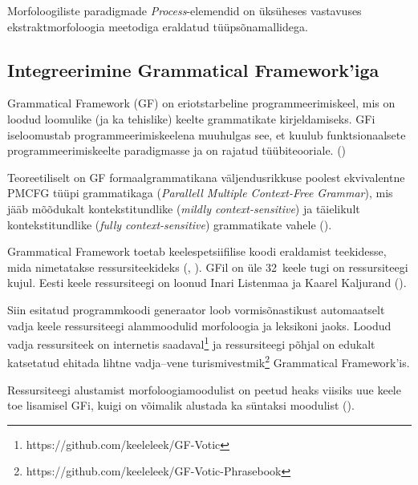 \documentclass[12pt,a4paper]{article}
\begin{document}
Morfoloogiliste paradigmade \textit{Process}-elemendid on üks\-üheses vastavuses ekstrakt\-morfoloogia meetodiga eraldatud tüüpsõna\-mallidega.




\FloatBarrier
\subsection{Integreerimine Grammatical Framework'iga}
\label{sec:gf}

Grammatical Framework (GF) on eriotstarbeline programmeerimis\-keel, mis on loodud loomulike (ja ka tehislike) keelte grammatikate kirjeldamiseks. GFi iseloomustab programmeerimis\-keelena muuhulgas see, et kuulub funktsionaalsete programmeerimis\-keelte paradigmasse ja on rajatud tüübiteooriale. (\cite[\RN{7}]{ranta_grammatical_2011}) %

Teoreetiliselt on GF formaal\-grammatikana väljendus\-rikkuse poolest ekvivalentne PMCFG tüüpi grammatikaga (\textit{Parallell Multiple Context-Free Grammar}), mis jääb mõõdukalt konteksti\-tundlike (\textit{mildly context-sensitive}) ja täielikult konteksti\-tundlike (\textit{fully context-sensitive}) grammatikate vahele (\cite[10]{ranta_grammatical_2011}).

Grammatical Framework toetab keele\-spetsiifilise koodi eraldamist teekidesse, mida nimetatakse ressursi\-teekideks (\cite{ranta_grammars_2008}, \cite[97]{ranta_grammatical_2011}). GFil on üle 32~keele tugi on ressursi\-teegi kujul. Eesti keele ressursi\-teegi on loonud Inari Listenmaa ja Kaarel Kaljurand (\citeyear{listenmaa_computational_2014}). %

Siin esitatud programm\-koodi generaator loob vormisõnastikust automaatselt vadja keele ressursi\-teegi alam\-moodulid morfoloogia ja leksikoni jaoks. Loodud vadja ressursi\-teek on internetis saadaval\footnote{https://github.com/keeleleek/GF-Votic} ja ressursi\-teegi põhjal on edukalt katsetatud ehitada lihtne vadja--vene turismi\-vestmik\footnote{https://github.com/keeleleek/GF-Votic-Phrasebook} Grammatical Framework'is.

Ressursi\-teegi alustamist morfoloogia\-moodulist on peetud heaks viisiks uue keele toe lisamisel GFi, kuigi on võimalik alustada ka süntaksi moodulist (\cite[209]{ranta_grammatical_2011}). %
\end{document}
